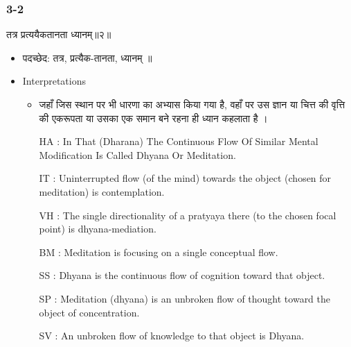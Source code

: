 \begin{frame}[fragile]\frametitle{3-2}
\begin{sanskrit}
तत्र प्रत्ययैकतानता ध्यानम्॥२॥
\end{sanskrit}

	\begin{itemize}
	\item पदच्छेद: तत्र, प्रत्यैक-तानता, ध्यानम् ॥
	\item Interpretations
		\begin{itemize}	
		\item जहाँ जिस स्थान पर भी धारणा का अभ्यास किया गया है, वहाँ पर उस ज्ञान या चित्त की वृत्ति की एकरूपता या उसका एक समान बने रहना ही ध्यान कहलाता है ।
		\item [HA]: In That (Dharana) The Continuous Flow Of Similar Mental Modification Is Called Dhyana Or Meditation.
		\item [IT]: Uninterrupted flow (of the mind) towards the object (chosen for meditation) is contemplation.
		\item [VH]: The single directionality of a pratyaya there (to the chosen focal point) is dhyana-mediation.
		\item [BM]: Meditation is focusing on a single conceptual flow.
		\item [SS]: Dhyana is the continuous flow of cognition toward that object.
		\item [SP]: Meditation (dhyana) is an unbroken flow of thought toward the object of concentration.
		\item [SV]: An unbroken flow of knowledge to that object is Dhyana. 
		\end{itemize}
	\end{itemize}
\end{frame}



